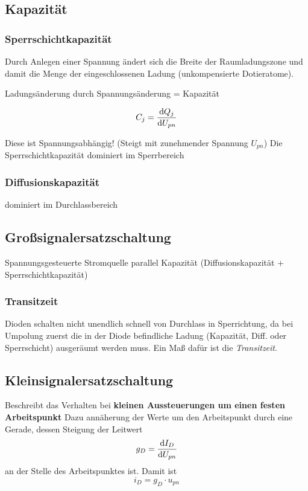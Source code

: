 \documentclass[a4paper, 12pt]{article}
\begin{document}
\subsection*{Kapazität}
\subsubsection*{Sperrschichtkapazität}
Durch Anlegen einer Spannung ändert sich die Breite der Raumladungszone und
damit die Menge der eingeschlossenen Ladung (unkompensierte Dotieratome).

Ladungsänderung durch Spannungsänderung = Kapazität

\[C_j = \frac{\mathop{}\!\mathrm{d} Q_j}{\mathop{}\!\mathrm{d} U_{pn}}\]

Diese ist Spannungsabhängig! (Steigt mit zunehmender Spannung $U_{pn}$)
Die Sperrschichtkapazität dominiert im Sperrbereich

\subsubsection*{Diffusionskapazität}
dominiert im Durchlassbereich

\subsection*{Großsignalersatzschaltung}
Spannungsgesteuerte Stromquelle parallel Kapazität (Diffusionskapazität + Sperrschichtkapazität)

\subsubsection*{Transitzeit}
Dioden schalten nicht unendlich schnell von Durchlass in Sperrichtung, da bei
Umpolung zuerst die in der Diode befindliche Ladung (Kapazität, Diff.
oder Sperrschicht) ausgeräumt werden muss. Ein Maß dafür ist die \emph{Transitzeit}.

\subsection*{Kleinsignalersatzschaltung}

Beschreibt das Verhalten bei \textbf{kleinen Aussteuerungen um einen festen Arbeitspunkt}
Dazu annäherung der Werte um den Arbeitspunkt durch eine Gerade, dessen Steigung
der Leitwert $$g_D = \frac{\mathop{}\!\mathrm{d} I_D}{\mathop{}\!\mathrm{d} U_{pn}}$$ an der Stelle des
Arbeitspunktes ist. Damit ist $$i_D = g_D \cdot u_{pn}$$
\end{document}

